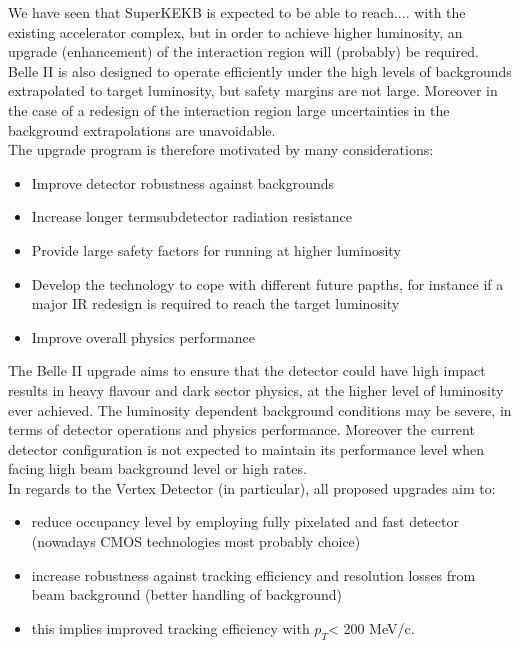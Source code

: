 We have seen that SuperKEKB is expected to be able to reach.... with the existing accelerator complex, but in order to achieve higher luminosity, an upgrade (enhancement) of the interaction region will (probably) be required.\\
Belle II is also designed to operate efficiently under the high levels of backgrounds extrapolated to target luminosity, but safety margins are not large. Moreover in the case of a redesign of the interaction region large uncertainties in the background extrapolations are unavoidable. \\
The upgrade program is therefore motivated by many considerations:

\begin{itemize}
\item Improve detector robustness against backgrounds
\item Increase longer termsubdetector radiation resistance
\item Provide large safety factors for running at higher luminosity
\item Develop the technology to cope with different future papths, for instance if a major IR redesign is required to reach the target luminosity
\item Improve overall physics performance
\end{itemize}

The Belle II upgrade aims to ensure that the detector could have high impact results in heavy flavour and dark sector physics, at the higher level of luminosity ever achieved. The luminosity dependent background conditions may be severe, in terms of detector operations and physics performance. Moreover the current detector configuration is not expected to maintain its performance level when facing high beam background level or high rates.\\

In regards to the Vertex Detector (in particular), all proposed upgrades aim to:

\begin{itemize}
\item reduce occupancy level by employing fully pixelated and fast detector (nowadays CMOS technologies most probably choice)
\item increase robustness against tracking efficiency and resolution losses from beam background (better handling of background)
\item this implies improved tracking efficiency with $p_{T}$< 200 MeV/c.
\end{itemize}





